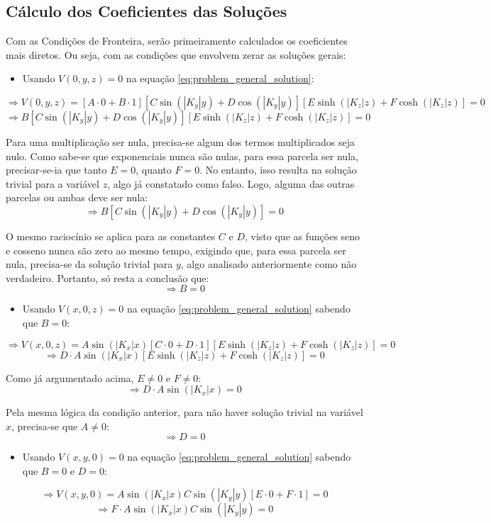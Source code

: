 \documentclass{report}
\begin{document}
\subsection{Cálculo dos Coeficientes das Soluções}

Com as Condições de Fronteira, serão primeiramente calculados os coeficientes mais diretos.
Ou seja, com as condições que envolvem zerar as soluções gerais:

\begin{itemize}
  \item Usando $ V(0, y, z) = 0 $ na equação \ref{eq:problem_general_solution}:
\end{itemize}
$$ \Rightarrow V(0, y, z) = [A \cdot 0 + B \cdot 1][C\sin(|K_y|y) + D\cos(|K_y|y)][E\sinh(|K_z|z) + F\cosh(|K_z|z)] = 0 $$
$$ \Rightarrow B[C\sin(|K_y|y) + D\cos(|K_y|y)][E\sinh(|K_z|z) + F\cosh(|K_z|z)] = 0 $$

Para uma multiplicação ser nula, precisa-se algum dos termos multiplicados seja nulo. Como sabe-se que
exponenciais nunca são nulas, para essa parcela ser nula, precisar-se-ia que tanto $ E = 0 $, quanto $ F = 0 $.
No entanto, isso resulta na solução trivial para a variável $ z $, algo já constatado como falso. Logo, alguma
das outras parcelas ou ambas deve ser nula:
$$ \Rightarrow B[C\sin(|K_y|y) + D\cos(|K_y|y)] = 0 $$

O mesmo raciocínio se aplica para as constantes $ C $ e $ D $, visto que as funções seno e cosseno nunca são zero
ao mesmo tempo, exigindo que, para essa parcela ser nula, precisa-se da solução trivial para $ y $, algo analisado
anteriormente como não verdadeiro. Portanto, só resta a conclusão que:
$$ \Rightarrow B = 0 $$

\begin{itemize}
  \item Usando $ V(x, 0, z) = 0 $ na equação \ref{eq:problem_general_solution} sabendo que $ B = 0 $:
\end{itemize}
$$ \Rightarrow V(x, 0, z) = A\sin(|K_x|x)[C\cdot 0 + D\cdot 1][E\sinh(|K_z|z) + F\cosh(|K_z|z)] = 0 $$
$$ \Rightarrow D\cdot A\sin(|K_x|x)[E\sinh(|K_z|z) + F\cosh(|K_z|z)] = 0 $$

Como já argumentado acima, $ E \neq 0 $ e $ F \neq 0 $:
$$ \Rightarrow D\cdot A\sin(|K_x|x) = 0 $$

Pela mesma lógica da condição anterior, para não haver solução trivial na variável $ x $, precisa-se que $ A \neq 0 $:
$$ \Rightarrow D = 0 $$

\begin{itemize}
  \item Usando $ V(x, y, 0) = 0 $ na equação \ref{eq:problem_general_solution} sabendo que $ B = 0 $ e $ D = 0 $:
\end{itemize}
$$ \Rightarrow V(x, y, 0) = A\sin(|K_x|x)C\sin(|K_y|y)[E\cdot 0 + F\cdot 1] = 0 $$
$$ \Rightarrow F\cdot A\sin(|K_x|x)C\sin(|K_y|y) = 0 $$
\end{document}
